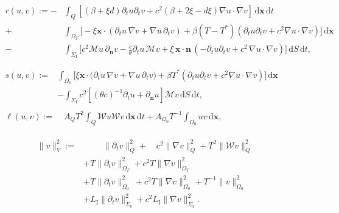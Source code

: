 \documentclass[10pt,a4paper]{amsart}
\newcommand{\Grad}[1]{\nabla #1}
\newcommand{\LI}{L_{\mathrm I}}
\newcommand{\NormDer}{{\partial_{\bm{n}}}}
\newcommand{\OZ}{{\Omega_0}}
\newcommand{\SI}{{\Sigma_{\mathrm I}}}
\newcommand{\TimeDer}{{\partial^{}_t}}
\newcommand{\dS}{{\,\mathrm{d}S}}
\newcommand{\dt}{{\,\mathrm{d}t}}
\newcommand{\dx}{{\,\mathrm{d}\vect x}}
\newcommand{\oW}{{\operator{W}}}
\newcommand{\operator}[1]{\mathcal{#1}}
\newcommand{\vect}[1]{\bm{#1}}
\begin{document}
\begin{align}	\label{eq:r_def}
	 & \begin{aligned}
		   r(u,v) := - & \int_Q \left[
			   (\beta + \xi d)\TimeDer{u}\TimeDer{v} + c^2  (\beta + 2 \xi - d\xi)\Grad u \cdot \Grad v
		   \right] \dx \dt                                                                                              \\
+           & \int_{\Omega_T} \big[-\xi \vect x \cdot (  \TimeDer{u} \,\Grad v+ \Grad u\, \TimeDer{v} )
+\beta (T-T^*)(\TimeDer{u} \TimeDer{v} + c^2 \Grad u \cdot \Grad v)\big] \dx                              \\
-           & \int_{\SI} \big[c^2 \operator{M} u\,\NormDer{v} -\frac{c}{\theta} \TimeDer{u}\, \operator{M} v
		   + \xi \,\vect x \cdot \vect{n}\,(-\TimeDer{u} \TimeDer{v}+  c^2\,\Grad u \cdot \Grad v)\big] \dS\dt,   \\
	   \end{aligned}        \\
\label{eq:s_def}
	 & \begin{aligned}
		   s(u,v) := & \int_{\Omega_0} \big[ \xi \vect x \cdot \big( \TimeDer{u} \,\Grad v+ \Grad u \,\TimeDer{v}\big)
		   +\beta T^* \left(\TimeDer{u} \TimeDer{v} + c^2 \Grad u \cdot \Grad v\right)\big] \dx                        \\
& -  \int_{\SI} c^2 \left[(\theta c)^{-1} \TimeDer{u} + \NormDer{u}\right]\operator{M} v  \dS \dt,
	   \end{aligned} \\
	\label{eq:ell_def}
	 & \begin{aligned}
		   \ell(u,v) := \; & A_QT^2\int_Q \oW u \oW v \dx \dt + A_\OZ T^{-1}\int_{\OZ} u v \dx,
	   \end{aligned}
\end{align}

\begin{equation}
	\label{eq:norm_def}
	\begin{split}
		\|v\|_V^2 :=& \qquad\; \|\TimeDer{v}\|_{Q}^2 + \quad c^2\|\Grad v\|_Q^2 + T^2 \|\operator{W} v\|_Q^2 \\
		& + T \|\TimeDer{v}\|_{\Omega_T}^2 + c^2 T \|\Grad v\|_{\Omega_T}^2 \\
		& + T \|\TimeDer{v}\|_{\Omega_0}^2 \:+ c^2 T \|\Grad v\|_{\Omega_0}^2 + T^{-1}\|v\|_{\OZ}^2 \\
		& + \LI \|\TimeDer{v}\|_{\SI}^2 + c^2 \LI \|\Grad v\|_{\SI}^2 .
	\end{split}
\end{equation}
\end{document}
